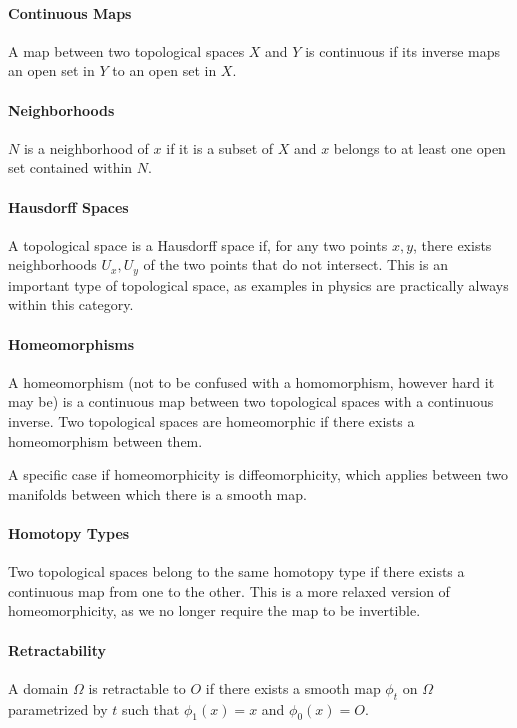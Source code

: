 \paragraph{Continuous Maps}
A map between two topological spaces $X$ and $Y$ is continuous if its inverse maps an open set in $Y$ to an open set in $X$.

\paragraph{Neighborhoods}
$N$ is a neighborhood of $x$ if it is a subset of $X$ and $x$ belongs to at least one open set contained within $N$.

\paragraph{Hausdorff Spaces}
A topological space is a Hausdorff space if, for any two points $x, y$, there exists neighborhoods $U_{x}, U_{y}$ of the two points that do not intersect. This is an important type of topological space, as examples in physics are practically always within this category.

\paragraph{Homeomorphisms}
A homeomorphism (not to be confused with a homomorphism, however hard it may be) is a continuous map between two topological spaces with a continuous inverse. Two topological spaces are homeomorphic if there exists a homeomorphism between them.

A specific case if homeomorphicity is diffeomorphicity, which applies between two manifolds between which there is a smooth map.

\paragraph{Homotopy Types}
Two topological spaces belong to the same homotopy type if there exists a continuous map from one to the other. This is a more relaxed version of homeomorphicity, as we no longer require the map to be invertible.

\paragraph{Retractability}
A domain $\Omega$ is retractable to $O$ if there exists a smooth map $\phi_{t}$ on $\Omega$ parametrized by $t$ such that $\phi_{1}(x) = x$ and $\phi_{0}(x) = O$.


